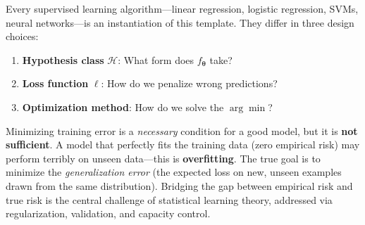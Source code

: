 Every supervised learning algorithm---linear regression, logistic regression, SVMs, neural networks---is an instantiation of this template. They differ in three design choices:
\begin{enumerate}
    \item \textbf{Hypothesis class} $\mathcal{H}$: What form does $f_{\boldsymbol{\theta}}$ take?
    \item \textbf{Loss function} $\ell$: How do we penalize wrong predictions?
    \item \textbf{Optimization method}: How do we solve the $\arg\min$?
\end{enumerate}

\begin{remark}
Minimizing training error is a \emph{necessary} condition for a good model, but it is \textbf{not sufficient}. A model that perfectly fits the training data (zero empirical risk) may perform terribly on unseen data---this is \textbf{overfitting}. The true goal is to minimize the \emph{generalization error} (the expected loss on new, unseen examples drawn from the same distribution). Bridging the gap between empirical risk and true risk is the central challenge of statistical learning theory, addressed via regularization, validation, and capacity control.
\end{remark}

